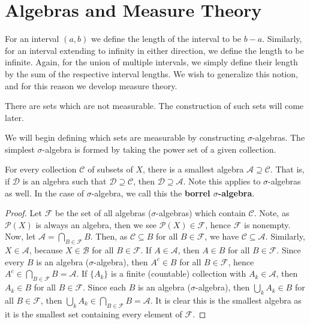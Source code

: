 \newpage
{}
\section{Algebras and Measure Theory}
For an interval $\left( a, b \right) $ we define the length of the interval to be $b-a$. Similarly, for an interval extending to infinity in either direction, we define the length to be infinite. Again, for the union of multiple intervals, we simply define their length by the sum of the respective interval lengths. We wish to generalize this notion, and for this reason we develop measure theory.
 \begin{remark}
There are sets which are not measurable. The construction of such sets will come later.
\end{remark}
We will begin defining which sets are measurable by constructing $\sigma$-algebras. The simplest $\sigma$-algebra is formed by taking the power set of a given collection.
\begin{proposition}
	 For every collection $\mathscr{C}$ of subsets of $X$, there is a smallest algebra $\mathscr{A} \supseteq \mathscr{C}$. That is, if $\mathscr{D}$ is an algebra such that $\mathscr{D} \supseteq \mathscr{C}$, then $\mathscr{D} \supseteq \mathscr{A}$. Note this applies to $\sigma$-algebras as well. In the case of $\sigma$-algebra, we call this the \textbf{borrel $\sigma$-algebra}.
\end{proposition}
\begin{proof}
	Let $\mathscr{F}$ be the set of all algebras ($\sigma$-algebras) which contain $\mathscr{C}$. Note, as $\mathscr{P}\left( X \right) $ is always an algebra, then we see $\mathscr{P} \left( X \right) \in \mathscr{F}$, hence $\mathscr{F}$ is nonempty. Now, let $\mathscr{A}= \bigcap_{B \in \mathscr{F}} B $. Then, as $\mathscr{C} \subseteq B$ for all $B \in \mathscr{F}$, we have $\mathscr{C} \subseteq \mathscr{A}$. Similarly, $X \in \mathscr{A}$, because $X \in \mathscr{B}$ for all $B \in \mathscr{F}$. If $A \in \mathscr{A}$, then $A \in B$ for all $B \in \mathscr{F}$. Since every $B$ is an algebra ($\sigma$-algebra), then $A^{c} \in B$ for all $B \in \mathscr{F}$, hence $A^{c} \in \bigcap_{B \in \mathscr{F}} B = \mathscr{A}$. If $ \{A_{k}\} $ is a finite (countable) collection with $A_{k} \in \mathscr{A}$, then $A_{k} \in B$ for all $B \in \mathscr{F}$. Since each $B$ is an algebra ($\sigma$-algebra), then $\bigcup_{k} A_{k} \in B$ for all $B \in \mathscr{F}$, then $\bigcup_{k} A_{k} \in \bigcap_{B \in \mathscr{F}} B = \mathscr{A}$. It is clear this is the smallest algebra as it is the smallest set containing every element of $\mathscr{F}$.
\end{proof}

